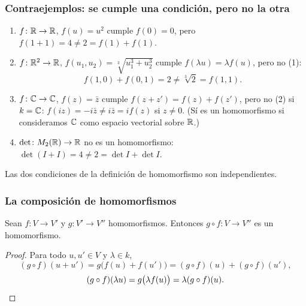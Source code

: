 \begin{frame}
    \frametitle{Contraejemplos: se cumple una condición, pero no la otra}

    \begin{example}
        \begin{enumerate}
            \item $f\colon\mathbb{R}\to\mathbb{R}$, $f(u)=u^2$ cumple $f(0)=0$, pero
            $f(1+1)=4\neq 2=f(1)+f(1)$.
            \item $f\colon\mathbb{R}^2\to\mathbb{R}$,
            $f(u_1,u_2)=\sqrt[3]{u_1^3+u_2^3}$ cumple
            $f(\lambda u)=\lambda f(u)$, pero no (1):
            \[
                f(1,0)+f(0,1)=2\neq\sqrt[3]{2}=f(1,1).
            \]
            \item $f\colon\mathbb{C}\to\mathbb{C}$, $f(z)=\bar z$ cumple
            $f(z+z')=f(z)+f(z')$, pero no (2) si $k=\mathbb{C}$:
            $f(iz)=-i\bar z\neq i\bar z=i f(z)$ si $z\neq0$.
            (Sí es un homomorfismo si consideramos $\mathbb{C}$ como espacio
            vectorial sobre $\mathbb{R}$.)
            \item $\det\colon M_2(\mathbb{R})\to\mathbb{R}$ no es un homomorfismo:
            $\det(I+I)=4\neq 2=\det I+\det I$.
        \end{enumerate}
    \end{example}

    Las dos condiciones de la definición de homomorfismo son \alert{independientes}.
\end{frame}


\begin{frame}
    \frametitle{La composición de homomorfismos}

    \begin{proposition}
        Sean $f\colon V\to V'$ y $g\colon V'\to V''$ homomorfismos. Entonces
        $g\circ f\colon V\to V''$ es un homomorfismo.
    \end{proposition}

    \begin{proof}
        Para todo $u,u'\in V$ y $\lambda\in k$,
        \[
            (g\circ f)(u+u')=g\bigl(f(u)+f(u')\bigr)
            =(g\circ f)(u)+(g\circ f)(u'),
        \]
        \[
            (g\circ f)(\lambda u)=g\bigl(\lambda f(u)\bigr)
            =\lambda(g\circ f)(u).\qedhere
        \]
    \end{proof}
\end{frame}


